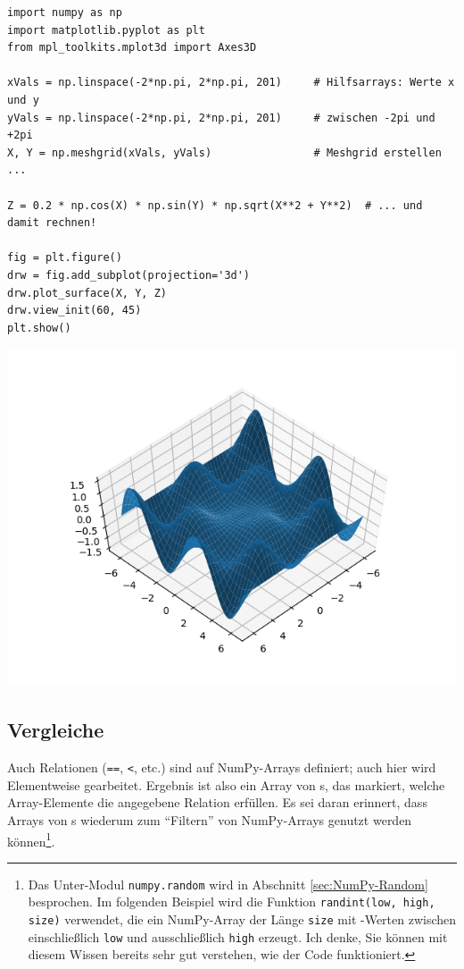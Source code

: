 \begin{codebox}
\begin{verbatim}
import numpy as np
import matplotlib.pyplot as plt
from mpl_toolkits.mplot3d import Axes3D

xVals = np.linspace(-2*np.pi, 2*np.pi, 201)     # Hilfsarrays: Werte x und y
yVals = np.linspace(-2*np.pi, 2*np.pi, 201)     # zwischen -2pi und +2pi
X, Y = np.meshgrid(xVals, yVals)                # Meshgrid erstellen ...

Z = 0.2 * np.cos(X) * np.sin(Y) * np.sqrt(X**2 + Y**2)  # ... und damit rechnen!

fig = plt.figure()
drw = fig.add_subplot(projection='3d')
drw.plot_surface(X, Y, Z)
drw.view_init(60, 45)
plt.show()
\end{verbatim}
\end{codebox}
%
\begin{tcolorbox}[title=Ausgabe: Wellen auf Wasser]
\begin{center}
	\includegraphics[width=.6\linewidth]{./gfx/np-wave}
\end{center}
\end{tcolorbox}

\subsection{Vergleiche}
Auch Relationen (\texttt{==}, \texttt{<}, etc.) sind auf NumPy-Arrays definiert; auch hier wird Elementweise gearbeitet. Ergebnis ist also ein Array von s, das markiert, welche Array-Elemente die angegebene Relation erfüllen. Es sei daran erinnert, dass Arrays von s wiederum zum \enquote{Filtern} von NumPy-Arrays genutzt werden können\footnote{Das Unter-Modul \texttt{numpy.random} wird in Abschnitt \ref{sec:NumPy-Random} besprochen. Im folgenden Beispiel wird die Funktion \texttt{randint(low, high, size)} verwendet, die ein NumPy-Array der Länge \texttt{size} mit -Werten zwischen einschließlich \texttt{low} und ausschließlich \texttt{high} erzeugt. Ich denke, Sie können mit diesem Wissen bereits sehr gut verstehen, wie der Code funktioniert.}.

